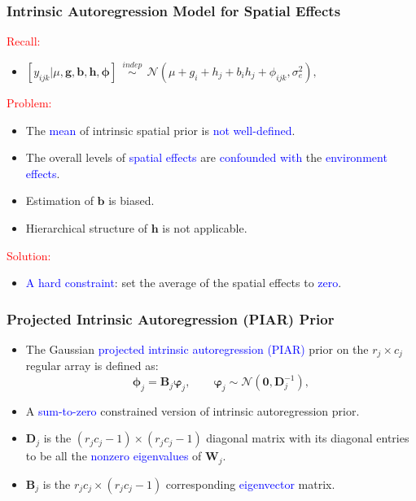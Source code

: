 \documentclass{beamer}
\newcommand{\bB}{\mathbf{B}}
\newcommand{\bD}{\mathbf{D}}
\newcommand{\bphi}{{\bm\phi}}
\newcommand{\bvarphi}{{\bm\varphi}}
\newcommand{\bW}{\mathbf{W}}
\begin{document}
\begin{frame}
	\frametitle{Intrinsic Autoregression Model for Spatial Effects}

\textcolor{red}{Recall: } 
\begin{itemize}
\item $[y_{ijk} | \mu, \mathbf{g}, \mathbf{b}, \mathbf{h}, \bphi ] \ \ \overset{indep}{\sim} \ \  \mathcal{N}(\mu + g_i + h_j + b_i h_j + \phi_{ijk}, \sigma_e^2), $
\end{itemize}

\pause
	
\textcolor{red}{Problem: }
\begin{itemize}
\item The \textcolor{blue}{mean} of intrinsic spatial prior is \textcolor{blue}{not well-defined}.
\item The overall levels of \textcolor{blue}{spatial effects} are \textcolor{blue}{confounded with} the \textcolor{blue}{environment effects}.
\item Estimation of $\mathbf{b}$ is biased.
\item Hierarchical structure of $\mathbf{h}$ is not applicable.
\end{itemize}

\pause
\textcolor{red}{Solution: }
	\begin{itemize}
\item  \textcolor{blue}{A hard constraint}:  set the average of the spatial effects to \textcolor{blue}{zero}.
\end{itemize}
 
\end{frame}




\begin{frame}
	\frametitle{Projected Intrinsic Autoregression (PIAR) Prior}

  	\begin{itemize}
	\item The Gaussian \textcolor{blue}{projected intrinsic autoregression (PIAR)} prior on the $r_j \times c_j$ regular array is defined as:
	\begin{equation*}
\bphi_j = \bB_j \bvarphi_j,\qquad \bvarphi_j\sim{\mathcal N}(\mathbf{0},\bD_j^{-1}),
\end{equation*}
\item A \textcolor{blue}{sum-to-zero} constrained version of intrinsic autoregression prior.
\item $\bD_j$ is the $(r_jc_j-1) \times (r_jc_j-1)$ diagonal matrix with its diagonal entries to be all the \textcolor{blue}{nonzero eigenvalues} of $\bW_j$.
\item  $\bB_{j}$ is the $r_jc_j \times (r_jc_j-1)$ corresponding \textcolor{blue}{eigenvector} matrix.
	\end{itemize}
	
\end{frame}
\end{document}
